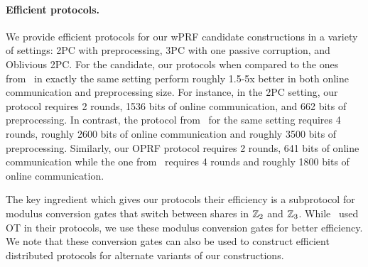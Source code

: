 \paragraph{Efficient protocols.}
We provide efficient protocols for our wPRF candidate constructions in a variety of settings: 2PC with preprocessing, 3PC with one passive corruption, and Oblivious 2PC. For the \ttwPRF candidate, our protocols when compared to the ones from~\cite{boneh2018-darkmatter} in exactly the same setting perform roughly 1.5-5x better in both online communication and preprocessing size. For instance, in the 2PC setting, our protocol requires 2 rounds, 1536 bits of online communication, and 662 bits of preprocessing. In contrast, the protocol from~\cite{boneh2018-darkmatter} for the same setting requires 4 rounds, roughly 2600 bits of online communication and roughly 3500 bits of preprocessing. Similarly, our OPRF protocol requires 2 rounds, 641 bits of online communication while the one from~\cite{boneh2018-darkmatter} requires 4 rounds and roughly 1800 bits of online communication.

The key ingredient which gives our protocols their efficiency is a subprotocol for modulus conversion gates that switch between shares in $\mathbb{Z}_2$ and $\mathbb{Z}_3$. While~\cite{boneh2018-darkmatter} used OT in their protocols, we use these modulus conversion gates for better efficiency. We note that these conversion gates can also be used to construct efficient distributed protocols for alternate variants of our constructions.


